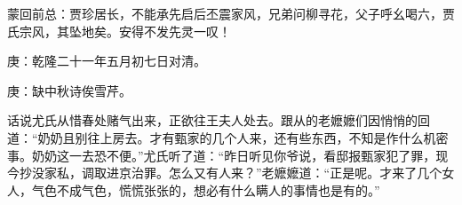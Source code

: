 

\begin{parag}
    \begin{note}蒙回前总：贾珍居长，不能承先启后丕震家风，兄弟问柳寻花，父子呼幺喝六，贾氏宗风，其坠地矣。安得不发先灵一叹！\end{note}
\end{parag}


\begin{parag}
    \begin{note}庚：乾隆二十一年五月初七日对清。\end{note}
\end{parag}


\begin{parag}
    \begin{note}庚：缺中秋诗俟雪芹。\end{note}
\end{parag}


\begin{parag}
    话说尤氏从惜春处赌气出来，正欲往王夫人处去。跟从的老嬷嬷们因悄悄的回道：“奶奶且别往上房去。才有甄家的几个人来，还有些东西，不知是作什么机密事。奶奶这一去恐不便。”尤氏听了道：“昨日听见你爷说，看邸报甄家犯了罪，现今抄没家私，调取进京治罪。怎么又有人来？”老嬷嬷道：“正是呢。才来了几个女人，气色不成气色，慌慌张张的，想必有什么瞒人的事情也是有的。”
\end{parag}


